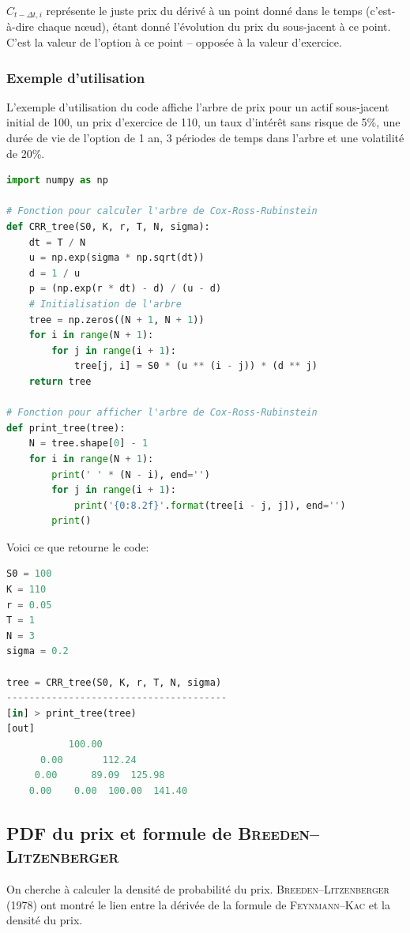 \documentclass[a4paper]{article}
\begin{document}
     $C_{t-\Delta t, i}$ représente le juste prix du dérivé à un point donné dans le temps (c’est-à-dire chaque nœud), étant donné l’évolution du prix du sous-jacent à ce point. C’est la valeur de l’option à ce point – opposée à la valeur d’exercice. 


 \subsubsection{Exemple d'utilisation}
 L'exemple d'utilisation du code affiche l'arbre de prix pour un actif sous-jacent initial de 100, un prix d'exercice de 110, un taux d'intérêt sans risque de 5\%, une durée de vie de l'option de 1 an, 3 périodes de temps dans l'arbre et une volatilité de 20\%.
\begin{lstlisting}[language=Python]
import numpy as np

# Fonction pour calculer l'arbre de Cox-Ross-Rubinstein
def CRR_tree(S0, K, r, T, N, sigma):
    dt = T / N
    u = np.exp(sigma * np.sqrt(dt))
    d = 1 / u
    p = (np.exp(r * dt) - d) / (u - d)
    # Initialisation de l'arbre
    tree = np.zeros((N + 1, N + 1))
    for i in range(N + 1):
        for j in range(i + 1):
            tree[j, i] = S0 * (u ** (i - j)) * (d ** j)
    return tree

# Fonction pour afficher l'arbre de Cox-Ross-Rubinstein
def print_tree(tree):
    N = tree.shape[0] - 1
    for i in range(N + 1):
        print(' ' * (N - i), end='')
        for j in range(i + 1):
            print('{0:8.2f}'.format(tree[i - j, j]), end='')
        print()
\end{lstlisting}
Voici ce que retourne le code:
\begin{lstlisting}[language=Python]
S0 = 100
K = 110
r = 0.05
T = 1
N = 3
sigma = 0.2

tree = CRR_tree(S0, K, r, T, N, sigma)
---------------------------------------
[in] > print_tree(tree)
[out]
           100.00
      0.00       112.24
     0.00      89.09  125.98       
    0.00    0.00  100.00  141.40
\end{lstlisting}

\subsection{PDF du prix et formule de \textsc{Breeden--Litzenberger}}

On cherche à calculer la densité de probabilité du prix. \textsc{Breeden--Litzenberger} (1978) ont montré le lien entre la dérivée de la formule de \textsc{Feynmann--Kac} et la densité du prix.
\end{document}
